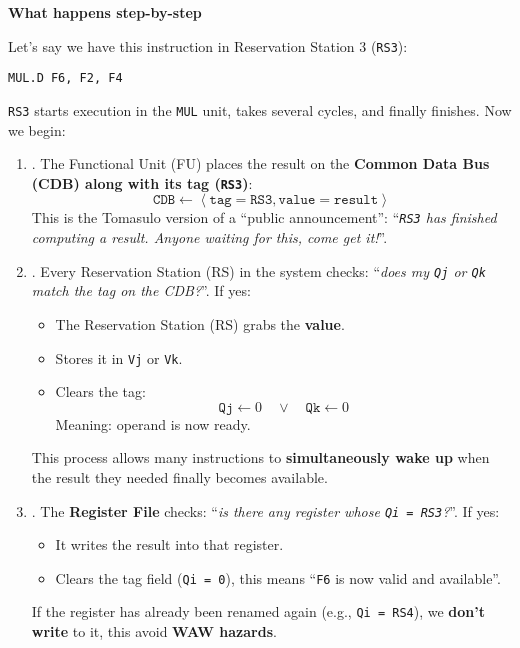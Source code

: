 \highspace
\begin{flushleft}
    \textcolor{Green3}{ \textbf{What happens step-by-step}}
\end{flushleft}
Let's say we have this instruction in Reservation Station 3 (\texttt{RS3}):
\begin{lstlisting}[language=unknown]
MUL.D F6, F2, F4
\end{lstlisting}
\texttt{RS3} starts execution in the \texttt{MUL} unit, takes several cycles, and finally finishes. Now we begin:
\begin{enumerate}
    \item {}. The Functional Unit (FU) places the result on the \textbf{Common Data Bus (CDB) along with its tag (\texttt{RS3})}:
    \begin{equation*}
        \texttt{CDB} \leftarrow \left\langle \texttt{tag} = \texttt{RS3}, \texttt{value} = \texttt{result} \right\rangle 
    \end{equation*}
    This is the Tomasulo version of a ``public announcement'': ``\emph{\texttt{RS3} has finished computing a result. Anyone waiting for this, come get it!}''.
    
    \item {}. Every Reservation Station (RS) in the system checks: ``\emph{does my \texttt{Qj} or \texttt{Qk} match the tag on the CDB?}''. If yes:
    \begin{itemize}
        \item The Reservation Station (RS) grabs the \textbf{value}.
        \item Stores it in \texttt{Vj} or \texttt{Vk}.
        \item Clears the tag:
        \begin{equation*}
            \texttt{Qj} \leftarrow 0 \hspace{1em} \lor \hspace{1em} \texttt{Qk} \leftarrow 0 
        \end{equation*}
        Meaning: operand is now ready.
    \end{itemize}
    This process allows many instructions to \textbf{simultaneously wake up} when the result they needed finally becomes available.
    
    \item {}. The \textbf{Register File} checks: ``\emph{is there any register whose \texttt{Qi = RS3}?}''. If yes:
    \begin{itemize}
        \item It writes the result into that register.
        \item Clears the tag field (\texttt{Qi = 0}), this means ``\texttt{F6} is now valid and available''.
    \end{itemize}
    If the register has already been renamed again (e.g., \texttt{Qi = RS4}), we \textbf{don't write} to it, this avoid \textbf{WAW hazards}.


\end{enumerate}
